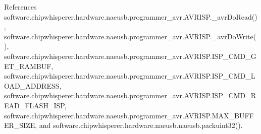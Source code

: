 References software.\+chipwhisperer.\+hardware.\+naeusb.\+programmer\+\_\+avr.\+A\+V\+R\+I\+S\+P.\+\_\+avr\+Do\+Read(), software.\+chipwhisperer.\+hardware.\+naeusb.\+programmer\+\_\+avr.\+A\+V\+R\+I\+S\+P.\+\_\+avr\+Do\+Write(), software.\+chipwhisperer.\+hardware.\+naeusb.\+programmer\+\_\+avr.\+A\+V\+R\+I\+S\+P.\+I\+S\+P\+\_\+\+C\+M\+D\+\_\+\+G\+E\+T\+\_\+\+R\+A\+M\+B\+U\+F, software.\+chipwhisperer.\+hardware.\+naeusb.\+programmer\+\_\+avr.\+A\+V\+R\+I\+S\+P.\+I\+S\+P\+\_\+\+C\+M\+D\+\_\+\+L\+O\+A\+D\+\_\+\+A\+D\+D\+R\+E\+S\+S, software.\+chipwhisperer.\+hardware.\+naeusb.\+programmer\+\_\+avr.\+A\+V\+R\+I\+S\+P.\+I\+S\+P\+\_\+\+C\+M\+D\+\_\+\+R\+E\+A\+D\+\_\+\+F\+L\+A\+S\+H\+\_\+\+I\+S\+P, software.\+chipwhisperer.\+hardware.\+naeusb.\+programmer\+\_\+avr.\+A\+V\+R\+I\+S\+P.\+M\+A\+X\+\_\+\+B\+U\+F\+F\+E\+R\+\_\+\+S\+I\+Z\+E, and software.\+chipwhisperer.\+hardware.\+naeusb.\+naeusb.\+packuint32().


